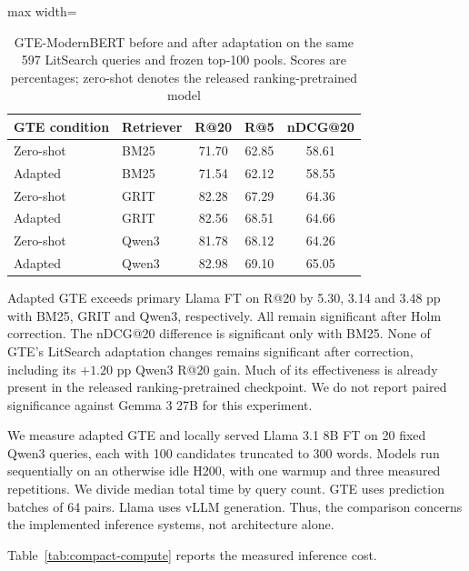 \documentclass[pdflatex,sn-basic,Numbered]{sn-jnl}%
\theoremstyle{thmstyleone}%
\theoremstyle{thmstyletwo}%
\theoremstyle{thmstylethree}%
\begin{document}
\begin{table}[ht]


\centering
\footnotesize
\setlength{\tabcolsep}{3pt}
\begin{adjustbox}{max width=\linewidth}
\begin{tabular}{l l c c c}
\hline
GTE condition & Retriever & R@20 & R@5 & nDCG@20 \\
\hline
Zero-shot & BM25 & 71.70 & 62.85 & 58.61 \\
Adapted   & BM25 & 71.54 & 62.12 & 58.55 \\
\hline
Zero-shot & GRIT & 82.28 & 67.29 & 64.36 \\
Adapted   & GRIT & 82.56 & 68.51 & 64.66 \\
\hline
Zero-shot & Qwen3 & 81.78 & 68.12 & 64.26 \\
Adapted   & Qwen3 & 82.98 & 69.10 & 65.05 \\
\hline
\end{tabular}
\end{adjustbox}


\caption{GTE-ModernBERT before and after adaptation on the same 597 LitSearch queries and frozen top-100 pools. Scores are percentages; zero-shot denotes the released ranking-pretrained model}
\label{tab:compact-litsearch}
\end{table}

Adapted GTE exceeds primary Llama FT on R@20 by 5.30, 3.14 and 3.48 pp with
BM25, GRIT and Qwen3, respectively. All remain significant after Holm correction.
The nDCG@20 difference is significant only with BM25. None of GTE's LitSearch
adaptation changes remains significant after correction, including its $+1.20$
pp Qwen3 R@20 gain. Much of its effectiveness is already present in the released
ranking-pretrained checkpoint. We do not report paired significance against
Gemma 3 27B for this experiment.

We measure adapted GTE and locally served Llama 3.1 8B FT on 20 fixed Qwen3
queries, each with 100 candidates truncated to 300 words. Models run sequentially
on an otherwise idle H200, with one warmup and three measured repetitions.
We divide median total time by query count. GTE uses prediction batches of
64 pairs. Llama uses vLLM generation. Thus, the comparison concerns the
implemented inference systems, not architecture alone.

Table~\ref{tab:compact-compute} reports the measured inference cost.
\end{document}
